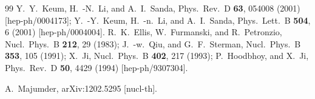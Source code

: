 \begin{thebibliography}{99}
  Y.~Y.~Keum, H.~-N.~Li, and A.~I.~Sanda,
  Phys.\ Rev.\ D {\bf 63}, 054008 (2001)
  [hep-ph/0004173];
  Y.~-Y.~Keum, H.~-n.~Li, and A.~I.~Sanda,
  Phys.\ Lett.\ B {\bf 504}, 6 (2001)
  [hep-ph/0004004].
  R.~K.~Ellis, W.~Furmanski, and R.~Petronzio,
  Nucl.\ Phys.\ B {\bf 212}, 29 (1983);
  J.~-w.~Qiu, and G.~F.~Sterman,
  Nucl.\ Phys.\ B {\bf 353}, 105 (1991);
  X.~Ji,
  Nucl.\ Phys.\ B {\bf 402}, 217 (1993);
  P.~Hoodbhoy, and X.~Ji,
  Phys.\ Rev.\ D {\bf 50}, 4429 (1994)
  [hep-ph/9307304].

  A.~Majumder,
  arXiv:1202.5295 [nucl-th].

\end{thebibliography}
